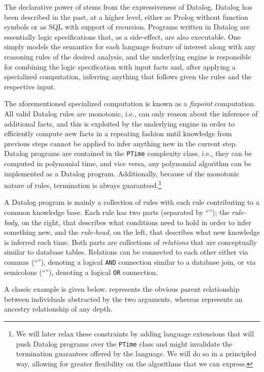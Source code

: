 The declarative power of \doop{} stems from the expressiveness of Datalog. Datalog has been described in the past, at a higher level, either as Prolog without function symbols or as SQL with support of recursion. Programs written in Datalog are essentially logic specifications that, as a side-effect, are also executable. One simply models the semantics for each language feature of interest along with any reasoning rules of the desired analysis, and the underlying engine is responsible for combining the logic specification with input facts and, after applying a specialized computation, inferring anything that follows given the rules and the respective input.

The aforementioned specialized computation is known as a \emph{fixpoint} computation. All valid Datalog rules are monotonic, i.e., can only reason about the inference of additional facts, and this is exploited by the underlying engine in order to efficiently compute new facts in a repeating fashion until knowledge from previous steps cannot be applied to infer anything new in the current step. Datalog programs are contained in the \texttt{PTime} complexity class, i.e., they can be computed in polynomial time, and vice versa, any polynomial algorithm can be implemented as a Datalog program. Additionally, because of the monotonic nature of rules, termination is always guaranteed.\footnote{We will later relax these constraints by adding language extensions that will push Datalog programs over the \texttt{PTime} class and might invalidate the termination guarantees offered by the language. We will do so in a principled way, allowing for greater flexibility on the algorithms that we can express.}

A Datalog program is mainly a collection of rules with each rule contributing to a common knowledge base. Each rule has two parts (separated by ``\dlIf{}''); the \emph{rule-body}, on the right, that describes what conditions need to hold in order to infer something new, and the \emph{rule-head}, on the left, that describes what new knowledge is inferred each time. Both parts are collections of \emph{relations} that are conceptually similar to database tables. Relations can be connected to each other either via commas (``\code{,}''), denoting a logical \texttt{AND} connection similar to a database join, or via semicolons (``\code{;}''), denoting a logical \texttt{OR} connection.

A classic example is given below.  represents the obvious parent relationship between individuals abstracted by the two arguments, whereas  represents an ancestry relationship of any depth. 

